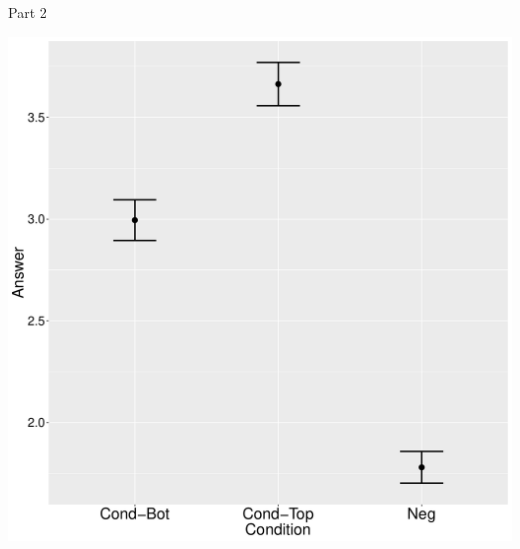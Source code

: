 \documentclass[ignorenonframetext,]{beamer}
\begin{document}
\begin{frame}{Part 2}

\begin{center}
\includegraphics[scale=0.3]{exp1-part_2-errorbars.pdf}
\end{center}

\end{frame}
\end{document}
